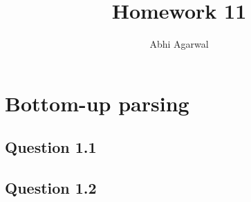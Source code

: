 \documentclass[11pt, oneside]{article}   	%
\title{Homework 11}
\author{Abhi Agarwal}
\date{}
\begin{document}
\maketitle

\section{Bottom-up parsing}

\subsection*{Question 1.1} 
\par 

\subsection*{Question 1.2} 
\par 
\end{document}
